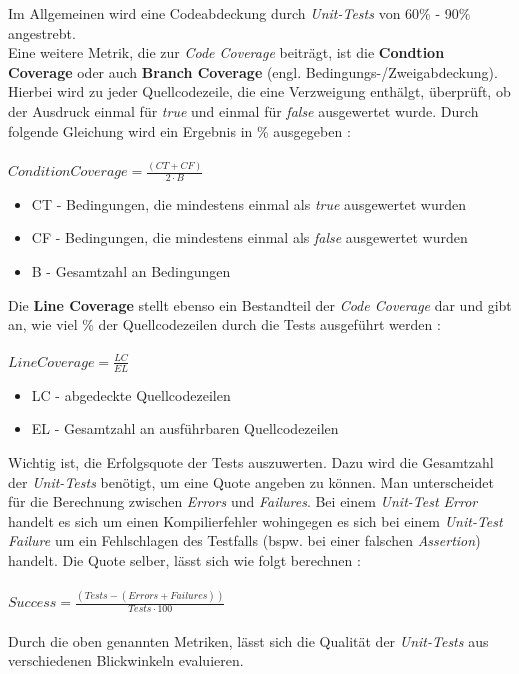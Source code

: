 Im Allgemeinen wird eine Codeabdeckung durch \textit{Unit-Tests} von 60\% - 90\% angestrebt. \cite*{WhatReasonableCode}\\
Eine weitere Metrik, die zur \textit{Code Coverage} beiträgt, ist die \textbf{Condtion Coverage} oder auch \textbf{Branch Coverage} (engl. Bedingungs-/Zweigabdeckung). Hierbei wird zu jeder Quellcodezeile, die eine Verzweigung enthälgt, überprüft, ob der Ausdruck einmal für \textit{true} und einmal für \textit{false} ausgewertet wurde. Durch folgende Gleichung wird ein Ergebnis in \% ausgegeben \cite*{MetricDefinition}:\\\\
$Condition Coverage = \frac{(CT + CF)}{2 \cdot B}$
\begin{itemize}
    \setlength{\parskip}{1pt}
    \item CT - Bedingungen, die mindestens einmal als \textit{true} ausgewertet wurden
    \item CF - Bedingungen, die mindestens einmal als \textit{false} ausgewertet wurden
    \item B - Gesamtzahl an Bedingungen
\end{itemize}
Die \textbf{Line Coverage} stellt ebenso ein Bestandteil der \textit{Code Coverage} dar und gibt an, wie viel \% der Quellcodezeilen durch die Tests ausgeführt werden \cite*{MetricDefinition}:\\\\
$Line Coverage = \frac{LC}{EL}$
\begin{itemize}
    \setlength{\parskip}{1pt}
    \item LC - abgedeckte Quellcodezeilen
    \item EL - Gesamtzahl an ausführbaren Quellcodezeilen
\end{itemize}
Wichtig ist, die Erfolgsquote der Tests auszuwerten. Dazu wird die Gesamtzahl der \textit{Unit-Tests} benötigt, um eine Quote angeben zu können. Man unterscheidet für die Berechnung zwischen \textit{Errors} und \textit{Failures}. Bei einem \textit{Unit-Test Error} handelt es sich um einen Kompilierfehler wohingegen es sich bei einem \textit{Unit-Test Failure} um ein Fehlschlagen des Testfalls (bspw. bei einer falschen \textit{Assertion}) handelt. Die Quote selber, lässt sich wie folgt berechnen \cite*{MetricDefinition}:\\\\
$Success = \frac{(Tests - (Errors + Failures))}{Tests \cdot 100}$\\\\
Durch die oben genannten Metriken, lässt sich die Qualität der \textit{Unit-Tests} aus verschiedenen Blickwinkeln evaluieren.\\\\
